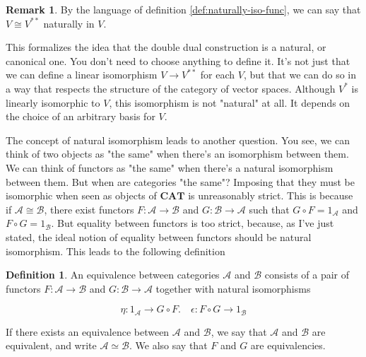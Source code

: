 \documentclass{article}
\theoremstyle{definition}
\newtheorem{definition}[theorem]{Definition}
\newtheorem{remark}[theorem]{Remark}
\newcommand{\cat}[1]{\mathscr{#1}}
\begin{document}

\begin{remark}
    By the language of definition \ref{def:naturally-iso-func}, we can say that $V \cong V^{**}$ naturally in $V$.

    This formalizes the idea that the double dual construction is a natural, or canonical one. You don't need to choose anything to define it. It's not just that we can define a linear isomorphism $V \to V^{**}$ for each $V$, but that we can do so in a way that respects the structure of the category of vector spaces. Although $V^{*}$ is linearly isomorphic to $V$, this isomorphism is not "natural" at all. It depends on the choice of an arbitrary basis for $V$.
\end{remark}

The concept of natural isomorphism leads to another question. You see, we can think of two objects as "the same" when there's an isomorphism between them. We can think of functors as "the same" when there's a natural isomorphism between them. But when are categories "the same"? Imposing that they must be isomorphic when seen as objects of $\textbf{CAT}$ is unreasonably strict. This is because if $\cat{A} \cong \cat{B}$, there exist functors $F : \cat{A} \to \cat{B}$ and $G : \cat{B} \to \cat{A}$ such that $G \circ F = 1_{\cat{A}}$ and $F \circ G = 1_{\cat{B}}$. But equality between functors is too strict, because, as I've just stated, the ideal notion of equality between functors should be natural isomorphism. This leads to the following definition

\begin{definition}
    An equivalence between categories $\cat{A}$ and $\cat{B}$ consists of a pair of functors $F : \cat{A} \to \cat{B}$ and $G : \cat{B} \to \cat{A}$ together with natural isomorphisms

    $$ \eta : 1_{\cat{A}} \to G \circ F. \quad \epsilon : F \circ G \to 1_{\cat{B}}$$

    If there exists an equivalence between $\cat{A}$ and $\cat{B}$, we say that $\cat{A}$ and $\cat{B}$ are equivalent, and write $\cat{A} \simeq \cat{B}$. We also say that $F$ and $G$ are equivalencies.
\end{definition}
\end{document}
